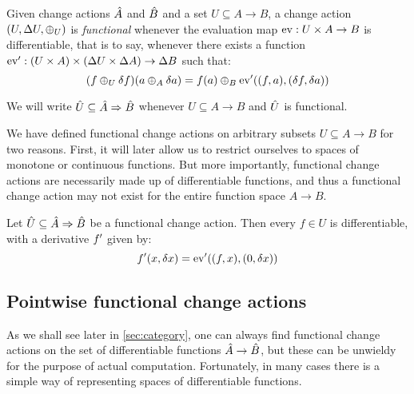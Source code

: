 \begin{defn}
  \label{def:functionalChanges}
  Given change actions $\hat{A}$ and $\hat{B}$ and a set $U \subseteq A \rightarrow B$, a change action
  $(U, \Delta U, \oplus_U)$ is \emph{functional} whenever the evaluation map $\operatorname{ev} : U \times A \rightarrow B$
  is differentiable, that is to say, whenever there exists a function 
  $\operatorname{ev}' : (U \times A) \times (\Delta U \times \Delta A) \rightarrow \Delta B$ such that:
  \begin{displaymath}
    (f \oplus_U \delta f)(a \oplus_A \delta a) = 
    f(a) \oplus_B \operatorname{ev}'((f, a), (\delta f, \delta a))
  \end{displaymath}
  
  We will write $\hat{U} \subseteq \hat{A} \Rightarrow \hat{B}$ whenever 
  $U \subseteq A \rightarrow B$ and $\hat{U}$ is functional.
\end{defn}

We have defined functional change actions on arbitrary subsets $U \subseteq A \rightarrow B$ for two
reasons. First, it will later allow us to restrict ourselves to spaces of monotone or continuous
functions. But more importantly, functional change actions are necessarily made up of differentiable
functions, and thus a functional change action may not exist for the entire function space
$A \rightarrow B$.

\begin{prop}
  \label{prop:differentiableFunctionalChanges}
  Let $\hat{U} \subseteq \hat{A} \Rightarrow \hat{B}$ be a functional change action. Then every 
  $f \in U$ is differentiable, with a derivative $f'$ given by:
  \begin{displaymath}
    f'(x, \delta x) = \operatorname{ev}'((f, x), (0, \delta x))
  \end{displaymath}
\end{prop}

\subsection{Pointwise functional change actions}
\label{sec:pointwiseFunctional}

As we shall see later in \cref{sec:category}, one can always find functional change actions on the set
of differentiable functions $\hat{A} \rightarrow \hat{B}$, but these can be unwieldy for 
the purpose of actual computation. Fortunately, in many cases there is a simple
way of representing spaces of differentiable functions.

